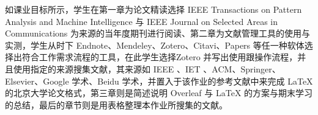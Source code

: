 \begin{cabstract}
如课业目标所示，学生在第一章为论文精读选择 IEEE Transactions on Pattern Analysis and Machine Intelligence 与 IEEE Journal on Selected Areas in Communications 为来源的当年度期刊进行阅读、第二章为文献管理工具的使用与实测，学生从时下 Endnote、Mendeley、Zotero、Citavi、Papers 等任一种软体选择出符合工作需求流程的工具，在此学生选择Zotero 并写出使用跟操作流程，并且使用指定的来源搜集文献，其来源如 IEEE 、IET 、ACM、Springer、Elsevier、Google 学术、Beidu 学术，并置入于该作业的参考文献中来完成 LaTeX 的北京大学论文格式，第三章则是简述说明 Overleaf 与 LaTeX 的方案与期末学习的总结，最后的章节则是用表格整理本作业所搜集的文献。

\end{cabstract}


